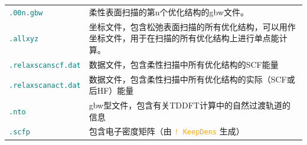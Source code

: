 \documentclass{ctexart}
\newcommand{\cmd}[1]{ \textcolor{orange}{\texttt{#1}} }
\newcommand{\file}[1]{ \textcolor{teal}{\texttt{#1}} }
\begin{document}
\begin{table}[H]
\begin{tabularx}{0.9\linewidth}{lX}
		 \file{.00n.gbw}          & 柔性表面扫描的第n个优化结构的gbw文件。  \\                                                                                              
	 \file{.allxyz}           & 坐标文件，包含松弛表面扫描的所有优化结构，可以用作坐标文件，用于在扫描的所有优化结构上进行单点能计算。   \\                        
		 \file{.relaxscanscf.dat} & 数据文件，包含柔性扫描中所有优化结构的SCF能量    \\                                                                                     
		 \file{.relaxscanact.dat} & 数据文件，包含柔性扫描中所有优化结构的实际（SCF或后HF）能量  \\                                                                         
		 \file{.nto}              & gbw型文件，包含有关TDDFT计算中的自然过渡轨道的信息    \\                                                                                
		\file{.scfp}             & 包含电子密度矩阵（由\cmd{! KeepDens}生成）                   \\                                                                             
			\bottomrule
	\end{tabularx}
	\end{table}
	
	
\end{document}
